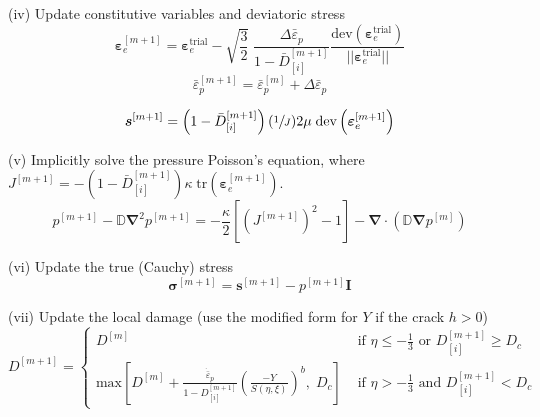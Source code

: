 \documentclass[sn-mathphys,Numbered,draft]{sn-jnl}%
\newcommand{\bb}{\boldsymbol}
\begin{document}
\begin{algorithm}[htbp]
(iv) Update constitutive variables and deviatoric stress
\begin{equation}
	\boldsymbol{\varepsilon}_{e}^{[m+1]}
	=
	\boldsymbol{\varepsilon}_{e}^{\text{trial}}
	- \sqrt{\frac{3}{2}} \; \frac{ \Delta\bar{\varepsilon}_p}{1 - \bar{D}^{[m+1]}_{[i]}}
	\frac{\text{dev}(\boldsymbol{\varepsilon}_{e}^{\text{trial}})}{||\boldsymbol{\varepsilon}_{e}^{\text{trial}}||}
	\nonumber
\end{equation}
\begin{equation}
	\bar{\varepsilon}_p^{[m+1]} = \bar{\varepsilon}_p^{[m]} + \Delta\bar{\varepsilon}_p \nonumber
\end{equation}

\begin{equation}
	\boldsymbol{s}^{[m+1]}
	=
	\left(1 - \bar{D}^{[m+1]}_{[i]}\right) (\sfrac{1}{J}) 2\mu \;\text{dev}\left(\boldsymbol{\varepsilon}_{e}^{[m+1]}\right) \nonumber
\end{equation}

(v) Implicitly solve the pressure Poisson's equation, where $J^{[m+1]} = -(1 - \bar{D}^{[m+1]}_{[i]}) \kappa \; \text{tr}\left(\boldsymbol{\varepsilon}_{e}^{[m+1]}\right)$.
\begin{equation}
	p^{[m+1]} - \mathbb{D} \bb{\nabla}^2 p^{[m+1]} = -\frac{\kappa}{2} \left[\left(J^{[m+1]}\right)^{2} - 1\right] - \bb{\nabla} \cdot \left( \mathbb{D} \bb{\nabla} p^{[m]} \right)
\end{equation}


(vi) Update the true (Cauchy) stress
\begin{equation}
	\boldsymbol{\sigma}^{[m+1]} = \boldsymbol{s}^{[m+1]} -  p^{[m+1]}\textbf{I} \nonumber
\end{equation}

(vii) Update the local damage (use the modified form for $Y$ if the crack $h > 0$)
\begin{equation} %
	D^{[m+1]} =
	\begin{cases}
		D^{[m]} & \text { if } \eta \leq -\frac{1}{3} \text{ or } D^{[m+1]}_{[i]} \geq D_c \\
		\text{max} \left[ D^{[m]} + \frac{\dot{\bar{\varepsilon}}_p}{1 - D^{[m+1]}_{[i]}}\left(\frac{-Y}{S(\eta,\xi)}\right)^b, \; D_c \right]
		& \text { if } \eta>-\frac{1}{3} \text{ and }  D^{[m+1]}_{[i]} < D_c
	\end{cases}
\end{equation}



\end{algorithm}
\end{document}

